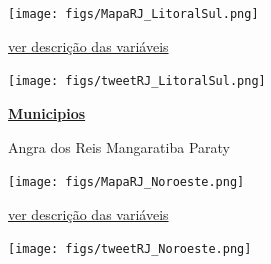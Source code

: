 \documentclass[10pt]{article} %
\begin{document}

\begin{minipage}[t]{.66\linewidth}
\hypertarget{LtrS}{}
\texttt{[image: figs/MapaRJ\_LitoralSul.png]}\vspace{0.5cm}\begin{center}

\end{center}
\small{\hyperlink{vartab}{ver descrição das variáveis}}\vspace{0.5cm}\begin{center}
\texttt{[image: figs/tweetRJ\_LitoralSul.png]}\end{center}
\end{minipage}\hfill\begin{minipage}[t]{.30\linewidth}
\begin{mdframed}[style=sidebar,frametitle={}]
\textbf{\hyperlink{municips}{Municipios}}\begin{itemize}\gsquare Angra dos Reis 
\gsquare Mangaratiba 
\gsquare Paraty 
\end{itemize}\BackToContents\end{mdframed}\hfill\end{minipage}\newpage\begin{minipage}[t]{.66\linewidth}
\hypertarget{Nrst}{}
\texttt{[image: figs/MapaRJ\_Noroeste.png]}\vspace{0.5cm}\begin{center}

\end{center}
\small{\hyperlink{vartab}{ver descrição das variáveis}}\vspace{0.5cm}\begin{center}
\texttt{[image: figs/tweetRJ\_Noroeste.png]}\end{center}
\end{minipage}\hfill\begin{minipage}[t]{.30\linewidth}

\end{minipage}
\end{document}
